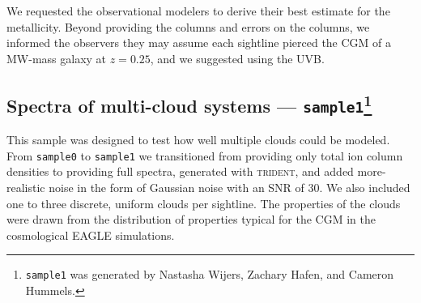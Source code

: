 \documentclass[fleqn,usenatbib]{mnras}
\begin{document}
We requested the observational modelers to derive their best estimate for the metallicity.
Beyond providing the columns and errors on the columns, we informed the observers they may assume each sightline pierced the CGM of a MW-mass galaxy at $z=0.25$, and we suggested using the \cite{Haardt2012} UVB.

\subsection[Spectra of multi-cloud systems --- \texttt{sample1}]{Spectra of multi-cloud systems --- \texttt{sample1}\footnote{
\texttt{sample1} was generated by Nastasha Wijers, Zachary Hafen, and Cameron Hummels.
}}
\label{s: data generation -- sample1}

This sample was designed to test how well multiple clouds could be modeled.
From \texttt{sample0} to \texttt{sample1} we transitioned from providing only total ion column densities to providing full spectra, generated with \textsc{trident}, and added more-realistic noise in the form of Gaussian noise with an SNR of 30.
We also included one to three discrete, uniform clouds per sightline.
The properties of the clouds were drawn from the distribution of properties typical for the CGM in the cosmological \textsc{EAGLE} simulations.
\end{document}
